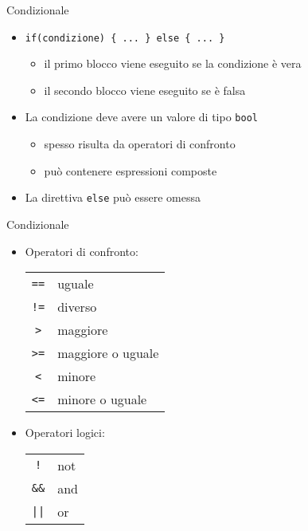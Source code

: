 \documentclass[xcolor=dvipsnames,handout]{beamer}
\begin{document}
\begin{frame}[fragile]{Condizionale}
  \vfill
  \begin{itemize}
    \item \lstinline$if(condizione) { ... } else { ... }$
    \begin{itemize}
      \item il primo blocco viene eseguito se la condizione è vera
      \item il secondo blocco viene eseguito se è falsa
    \end{itemize}
    \vfill
    \item La condizione deve avere un valore di tipo \lstinline$bool$
    \begin{itemize}
      \item spesso risulta da operatori di \alert{confronto}
      \item può contenere espressioni composte
    \end{itemize}
    \vfill
    \item La direttiva \lstinline$else$ può essere omessa
  \end{itemize}
  \vfill
\end{frame}

\begin{frame}[fragile]{Condizionale}
  \vfill
  \begin{itemize}
    \item Operatori di confronto:\\[.5em]
    \hspace{5mm}\begin{tabular}{cl}
      \lstinline$==$ & uguale \\
      \lstinline$!=$ & diverso \\
      \lstinline$>$ & maggiore \\
      \lstinline$>=$ & maggiore o uguale \\
      \lstinline$<$ & minore \\
      \lstinline$<=$ & minore o uguale \\
    \end{tabular}
    \vfill
    \item Operatori logici:\\[.5em]
    \hspace{5mm}\begin{tabular}{cl}
      \lstinline$!$ & not \\
      \lstinline$&&$ & and \\
      \lstinline$||$ & or \\
    \end{tabular}
  \end{itemize}
  \vfill
\end{frame}
\end{document}
